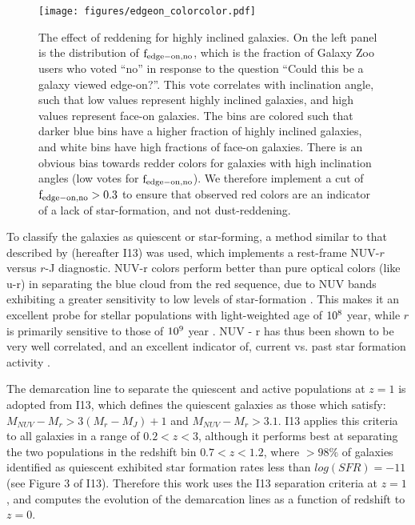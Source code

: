 \begin{figure}
\centering
\texttt{[image: figures/edgeon\_colorcolor.pdf]}
\caption{The effect of reddening for highly inclined galaxies. On the left panel is the distribution of $\rm f_{edge-on,no}$, which is the fraction of Galaxy Zoo users who voted ``no'' in response to the question ``Could this be a galaxy viewed edge-on?''. This vote correlates with inclination angle, such that low values represent highly inclined galaxies, and high values represent face-on galaxies. The bins are colored such that darker blue bins have a higher fraction of highly inclined galaxies, and white bins have high fractions of face-on galaxies. There is an obvious bias towards redder colors for galaxies with high inclination angles (low votes for $\rm f_{edge-on,no}$). We therefore implement a cut of $\rm f_{edge-on,no}>0.3$ to ensure that observed red colors are an indicator of a lack of star-formation, and not dust-reddening.}
\label{fig:edgeon}
\end{figure}
To classify the galaxies as quiescent or star-forming, a method similar to that described by \citet{Ilbert2013} (hereafter I13) was used, which implements a rest-frame NUV-$r$ versus $r$-J diagnostic. NUV-r colors perform better than pure optical colors (like u-r) in separating the blue cloud from the red sequence, due to NUV bands exhibiting a greater sensitivity to low levels of star-formation \citep{Martin2007,Wyder2007}. This makes it an excellent probe for stellar populations with light-weighted age of $\rm 10^8$ year, while $r$ is primarily sensitive to those of $\rm 10^9$ year \citep{Arnouts2007a}. NUV - r has thus been shown to be very well correlated, and an excellent indicator of, current vs. past star formation activity \citep{Martin2005,Salim2005a}. 

The demarcation line to separate the quiescent and active populations at $z=1$ is adopted from I13, which defines the quiescent galaxies as those which satisfy: $M_{NUV}-M_{r} > 3(M_{r}-M_{J})+1$ and $M_{NUV}-M_{r} > 3.1$. I13 applies this criteria to all galaxies in a range of $0.2<z<3$, although it performs best at separating the two populations in the redshift bin $0.7<z<1.2$, where $>98\%$ of galaxies identified as quiescent exhibited star formation rates less than $log(SFR) = -11$ (see Figure 3 of I13). Therefore this work uses the I13 separation criteria at $z=1$, and computes the evolution of the demarcation lines as a function of redshift to $z=0$. 

